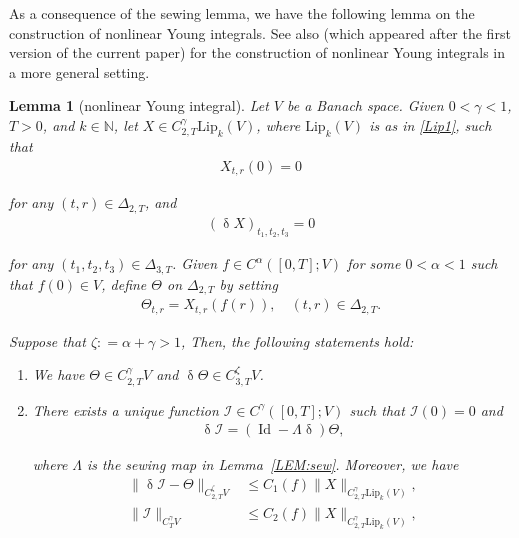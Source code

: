 \documentclass[letterpaper, 11pt,  reqno]{amsart}
\newtheorem{lemma}[theorem]{Lemma}
\DeclareMathOperator{\Id}{Id}
\newcommand{\1}{\hspace{0.5mm}\text{I}\hspace{0.5mm}}
\newcommand{\I}{\mathcal{I}}
\newcommand{\noi}{\noindent}
\newcommand{\al}{\alpha}
\newcommand{\updl}{\updelta}
\newcommand{\Dl}{\Delta}
\newcommand{\g}{\gamma}
\newcommand{\N}{\mathbb{N}}
\newcommand{\Lip}{\mathrm{Lip}}
\newcommand{\z}{\zeta}
\numberwithin{equation}{section}
\numberwithin{theorem}{section}
\begin{document}
As a consequence of the sewing lemma, 
we have the following lemma
on the construction of nonlinear Young integrals.
See also 
 \cite{HK, G23} (which appeared after the first version of the current paper)
 for the construction of  nonlinear Young integrals
 in a more general setting.


\begin{lemma}[nonlinear Young integral]
\label{LEM:int1}
Let $V$ be a Banach space.
Given $0 < \g < 1$, 
 $T>0$, and $k \in \N$, %
let $X\in C^\g_{2,T}\Lip_k(V)$, where $\Lip_k(V)$ is as in \eqref{Lip1}, such that 
\begin{align}
X_{t,r}(0)=0
\label{Ja0}
\end{align} 

\noi
for any $(t,r) \in  \Dl_{2,T}$, 
and 
\begin{align}
\label{Ja1}
(\updl X)_{t_1,t_2,t_3} = 0
\end{align}


\noi
for any $(t_1,t_2,t_3)\in \Dl_{3,T}$.
Given 
  $f\in C^{\al}([0,T];V)$ for some $0 < \al < 1$
  such that $f(0) \in V$, 
define  $\Theta$ on $\Dl_{2,T}$
by setting
\begin{align}
\Theta_{t,r} = X_{t,r}(f(r)), \quad (t,r)\in \Dl_{2,T}.
\label{Ja1a}
\end{align}



\noi
Suppose that 
 $\z : = \al + \g > 1$, 
Then,  the following statements hold\textup{:}

\smallskip

\begin{enumerate}


\item[(i)] 
We have $\Theta\in C^\g_{2,T}V$
and
$\updl \Theta \in C^\z_{3,T}V$.




\smallskip

\item[(ii)]
There exists 
a unique function 
$\I\in C^\g([0,T]; V)$
such that $\I(0) =0$ and
\begin{align}
\updl \I = (\Id - \Lambda \updl)\Theta, 
\label{Ja1b}
\end{align}

\noi
where $\Lambda$ is the sewing map in Lemma~\ref{LEM:sew}. 
Moreover,
we have 
\begin{align}
\|\updl \I - \Theta\|_{C^\z_{2,T}  V}
& \leq 
C_1(f)
\|X\|_{C^\g_{2,T}\Lip_k(V)},
\label{Ja2}
\\
\|\I\|_{C^\g_T  V} 
& \leq
C_2(f)
\|X\|_{C^\g_{2,T}\Lip_k(V)}, 
\label{Ja3}
\end{align}



\end{enumerate}
\end{lemma}
\end{document}
